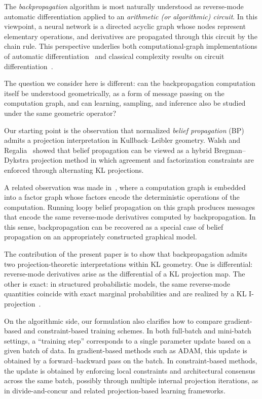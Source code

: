 \documentclass[12pt]{article}
\newcommand{\1}{\mathbb{1}}
\theoremstyle{definition}
\begin{document}
The \emph{backpropagation} algorithm is most naturally
understood as reverse-mode automatic differentiation applied to an
\emph{arithmetic (or algorithmic) circuit}. In this viewpoint, a neural
network is a directed acyclic graph whose nodes represent elementary
operations, and derivatives are propagated through this circuit by the
chain rule. This perspective underlies both computational-graph
implementations of automatic differentiation~\cite{baydin2018automatic}
and classical complexity results on circuit differentiation~\cite{parberry1994circuit}.

The question we consider here is different: can the
backpropagation computation itself be understood geometrically, as a
form of message passing on the computation graph, and can learning,
sampling, and inference also be studied under the same geometric
operator?

Our starting point is the observation that normalized
\emph{belief propagation} (BP) admits a projection interpretation in
Kullback--Leibler geometry. Walsh and Regalia~\cite{walsh2010bp} showed
that belief propagation can be viewed as a hybrid Bregman--Dykstra
projection method in which agreement and factorization constraints are
enforced through alternating KL projections.

A related observation was made in~\cite{eaton2022backprop}, where a
computation graph is embedded into a factor graph whose factors encode
the deterministic operations of the computation. Running loopy belief
propagation on this graph produces messages that encode the same
reverse-mode derivatives computed by backpropagation. In this sense,
backpropagation can be recovered as a special case of belief
propagation on an appropriately constructed graphical model. 

The contribution of the present paper is to show that
backpropagation admits two projection-theoretic interpretations within
KL geometry. One is differential: reverse-mode derivatives arise as the
differential of a KL projection map. The other is exact: in structured
probabilistic models, the same reverse-mode quantities coincide with
exact marginal probabilities and are realized by a KL
I-projection~\cite{csiszar1975idivergence}.

On the algorithmic side, our formulation also clarifies how to compare
gradient-based and constraint-based training schemes. In both
full-batch and mini-batch settings, a “training step” corresponds to a
single parameter update based on a given batch of data. In
gradient-based methods such as ADAM, this update is obtained by a
forward--backward pass on the batch. In constraint-based methods, the
update is obtained by enforcing local constraints and architectural
consensus across the same batch, possibly through multiple internal
projection iterations, as in divide-and-concur and related
projection-based learning frameworks.
\end{document}
